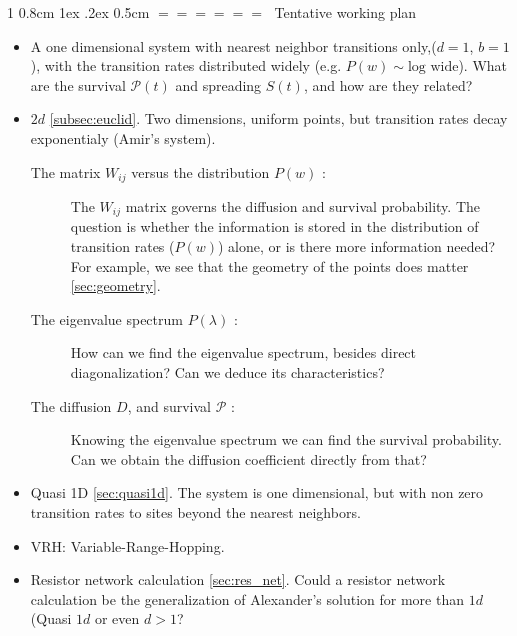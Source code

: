\documentclass[onecolumn,fleqn,notitlepage,secnumarabic]{revtex4}
\makeatletter
\def\section{%
  \@startsection
    {section}%
    {1}%
    {\z@}%
    {0.8cm \@plus1ex \@minus .2ex}%
    {0.5cm}%
    {\Large\bf $=\!=\!=\!=\!=\!=\;$}%
}%
\makeatother
\begin{document}
\section{Tentative working plan}
\begin{itemize}
    \item A one dimensional system with nearest neighbor transitions only,($d=1$, $b=1$), with the transition rates distributed widely (e.g. $P(w) \sim \textrm{log wide}$). What are the survival $\mathcal{P}(t)$ and spreading $S(t)$, and how are they related?
    \item $2d$ \ref{subsec:euclid}. Two dimensions, uniform points, but transition rates decay exponentialy (Amir's system). 
        \begin{description}
        \item[The matrix $W_{ij}$ versus the distribution $P(w)$ : ] The $W_{ij}$ matrix governs the diffusion and survival probability. The question is whether the information is stored in the distribution of transition rates ($P(w)$) alone, or is there more information needed? For example, we see that the geometry of the points does matter \ref{sec:geometry}.
        \item[The eigenvalue spectrum $P(\lambda)$ : ] How can we find the eigenvalue spectrum, besides direct diagonalization? Can we deduce its characteristics?
        \item[The diffusion $D$, and survival $\mathcal{P}$ : ] Knowing the eigenvalue spectrum we can find the survival probability. Can we obtain the diffusion coefficient directly from that? 
        \end{description}
    \item Quasi 1D \ref{sec:quasi1d}. The system is one dimensional, but with non zero transition rates to sites beyond the nearest neighbors.
    \item VRH: Variable-Range-Hopping. 
    \item Resistor network calculation \ref{sec:res_net}. Could a resistor network calculation be the generalization of Alexander's solution for more than $1d$ (Quasi $1d$ or even $d>1$?

\end{itemize}

\end{document}
